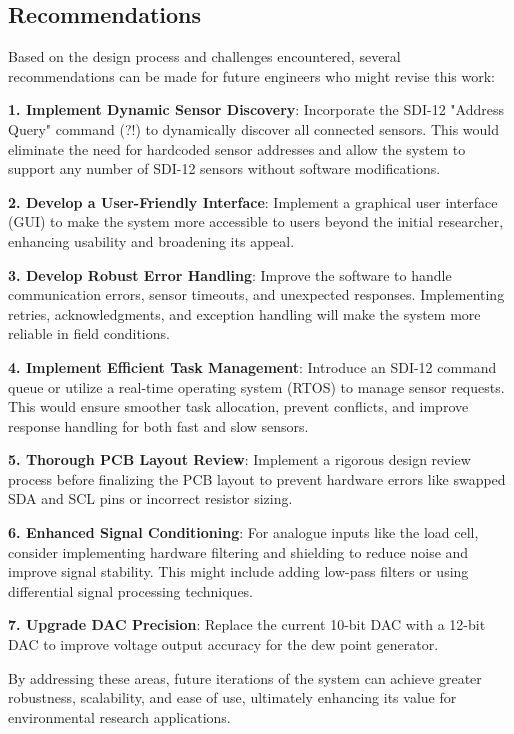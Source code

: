 \subsection{Recommendations}

Based on the design process and challenges encountered, several recommendations can be made for future engineers who might revise this work:

\textbf{1. Implement Dynamic Sensor Discovery}: Incorporate the SDI-12 "Address Query" command (?!) to dynamically discover all connected sensors. This would eliminate the need for hardcoded sensor addresses and allow the system to support any number of SDI-12 sensors without software modifications.

\textbf{2. Develop a User-Friendly Interface}: Implement a graphical user interface (GUI) to make the system more accessible to users beyond the initial researcher, enhancing usability and broadening its appeal.

\textbf{3. Develop Robust Error Handling}: Improve the software to handle communication errors, sensor timeouts, and unexpected responses. Implementing retries, acknowledgments, and exception handling will make the system more reliable in field conditions.

\textbf{4. Implement Efficient Task Management}: Introduce an SDI-12 command queue or utilize a real-time operating system (RTOS) to manage sensor requests. This would ensure smoother task allocation, prevent conflicts, and improve response handling for both fast and slow sensors.

\textbf{5. Thorough PCB Layout Review}: Implement a rigorous design review process before finalizing the PCB layout to prevent hardware errors like swapped SDA and SCL pins or incorrect resistor sizing.

\textbf{6. Enhanced Signal Conditioning}: For analogue inputs like the load cell, consider implementing hardware filtering and shielding to reduce noise and improve signal stability. This might include adding low-pass filters or using differential signal processing techniques.

\textbf{7. Upgrade DAC Precision}: Replace the current 10-bit DAC with a 12-bit DAC to improve voltage output accuracy for the dew point generator.

By addressing these areas, future iterations of the system can achieve greater robustness, scalability, and ease of use, ultimately enhancing its value for environmental research applications.